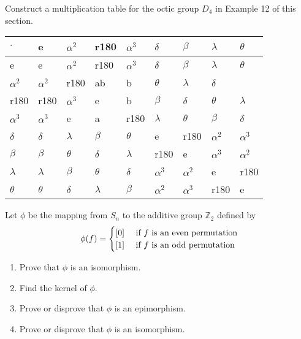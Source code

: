 \documentclass[paper=a4, fontsize=11pt]{jhwhw} %
\begin{document}
Construct a multiplication table for the octic group $D_4$ in Example 12 of this section.
\solution
\begin{table}[h]
\begin{tabular}{l|l|l|l|l|l|l|l|l|}
$\cdot$    & e   & $\alpha^{2}$  & r180 & $\alpha^{3}$ & $\delta$    & $\beta$    & $\lambda$   & $\theta$   \\ \hline
e   & e   & $\alpha^{2}$  & r180 & $\alpha^{3}$ & $\delta$    & $\beta$    & $\lambda$   & $\theta$   \\ \hline
$\alpha^{2}$  & $\alpha^{2}$  & r180 & ab   & b    & $\theta$   & $\lambda$   & $\delta$    &      \\ \hline
r180 & r180 & $\alpha^{3}$ & e   & b    & $\beta$    & $\delta$    & $\theta$   & $\lambda$   \\ \hline
$\alpha^{3}$ & $\alpha^{3}$ & e   & a    & r180 & $\lambda$   & $\theta$   & $\beta$    & $\delta$    \\ \hline
$\delta$    & $\delta$    & $\lambda$   & $\beta$    & $\theta$   & e   & r180 & $\alpha^{2}$  & $\alpha^{3}$ \\ \hline
$\beta$    & $\beta$    & $\theta$   & $\delta$    & $\lambda$   & r180 & e   & $\alpha^{3}$ & $\alpha^{2}$  \\ \hline
$\lambda$   & $\lambda$   & $\beta$    & $\theta$   & $\delta$    & $\alpha^{3}$ & $\alpha^{2}$  & e   & r180 \\ \hline
$\theta$   & $\theta$   & $\delta$    & $\lambda$   & $\beta$    & $\alpha^{2}$  & $\alpha^{3}$ & r180 & e   \\ \hline
\end{tabular}
\end{table}


Let $\phi$ be the mapping from $S_n$ to the additive group $\mathbb Z_2$ defined by
$$\phi(f) =
  \begin{cases} 
          \hfill [0]    \hfill & \text{ if $f$ is an even permutation} \\
          \hfill [1] \hfill & \text{ if $f$ is an odd permutation} \\
  \end{cases}
$$
\begin{enumerate}
        \item Prove that $\phi$ is an isomorphism.
        \item Find the kernel of $\phi$.
        \item Prove or disprove that $\phi$ is an epimorphism.
        \item Prove or disprove that $\phi$ is an isomorphism.
\end{enumerate}
\solution
\end{document}
